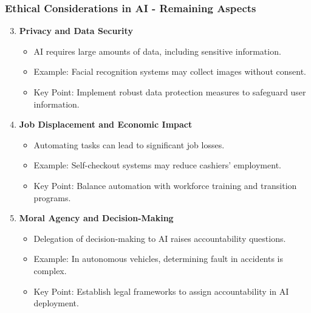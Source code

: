 \documentclass[aspectratio=169]{beamer}
\begin{document}
\begin{frame}[fragile]
    \frametitle{Ethical Considerations in AI - Remaining Aspects}
    \begin{enumerate}
        \setcounter{enumi}{2}
        \item \textbf{Privacy and Data Security}
            \begin{itemize}
                \item AI requires large amounts of data, including sensitive information.
                \item Example: Facial recognition systems may collect images without consent.
                \item Key Point: Implement robust data protection measures to safeguard user information.
            \end{itemize}
        
        \item \textbf{Job Displacement and Economic Impact}
            \begin{itemize}
                \item Automating tasks can lead to significant job losses.
                \item Example: Self-checkout systems may reduce cashiers' employment.
                \item Key Point: Balance automation with workforce training and transition programs.
            \end{itemize}

        \item \textbf{Moral Agency and Decision-Making}
            \begin{itemize}
                \item Delegation of decision-making to AI raises accountability questions.
                \item Example: In autonomous vehicles, determining fault in accidents is complex.
                \item Key Point: Establish legal frameworks to assign accountability in AI deployment.
            \end{itemize}
    \end{enumerate}
\end{frame}
\end{document}
